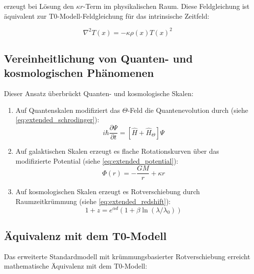 \documentclass[12pt,a4paper]{article}
\newcommand{\Tfield}{T(x)}
\begin{document}
	erzeugt bei Lösung den $\kappa r$-Term im physikalischen Raum. Diese Feldgleichung ist äquivalent zur T0-Modell-Feldgleichung für das intrinsische Zeitfeld\cite{pascher_lagrange_2025}:
	
	\begin{equation}
		\label{eq:t_field_eq}
		\nabla^2 \Tfield = -\kappa \rho(x) \Tfield^2
	\end{equation}
	
	\subsection{Vereinheitlichung von Quanten- und kosmologischen Phänomenen}
	\label{subsec:quantum_cosmo}
	
	Dieser Ansatz überbrückt Quanten- und kosmologische Skalen\cite{pascher_part1_2025, pascher_part2_2025}:
	
	\begin{enumerate}
		\item Auf Quantenskalen modifiziert das $\Theta$-Feld die Quantenevolution durch (siehe \cref{eq:extended_schrodinger}):
		\begin{equation}
			i\hbar\frac{\partial\Psi}{\partial t} = [\hat{H} + \hat{H}_{\Theta}]\Psi
		\end{equation}
		
		\item Auf galaktischen Skalen erzeugt es flache Rotationskurven über das modifizierte Potential (siehe \cref{eq:extended_potential}):
		\begin{equation}
			\Phi(r) = -\frac{GM}{r} + \kappa r
		\end{equation}
		
		\item Auf kosmologischen Skalen erzeugt es Rotverschiebung durch Raumzeitkrümmung (siehe \cref{eq:extended_redshift}):
		\begin{equation}
			1 + z = e^{\alpha d}(1 + \beta \ln(\lambda/\lambda_0))
		\end{equation}
	\end{enumerate}
	
	\subsection{Äquivalenz mit dem T0-Modell}
	\label{subsec:model_equivalence}
	
	Das erweiterte Standardmodell mit krümmungsbasierter Rotverschiebung erreicht mathematische Äquivalenz mit dem T0-Modell\cite{pascher_messdifferenzen_2025, pascher_feldtheorie_2025}:
	
\end{document}
